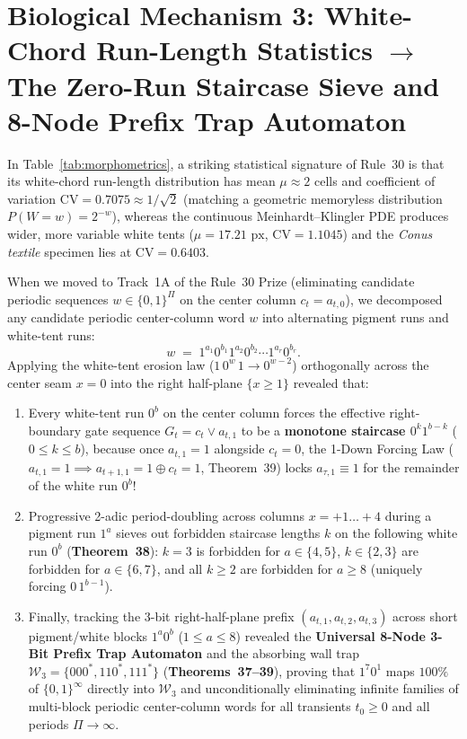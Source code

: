 \documentclass[11pt,a4paper]{article}
\theoremstyle{definition}
\theoremstyle{remark}
\begin{document}
\section{Biological Mechanism 3: White-Chord Run-Length Statistics $\longrightarrow$ The Zero-Run Staircase Sieve and 8-Node Prefix Trap Automaton}

In Table~\ref{tab:morphometrics}, a striking statistical signature of Rule~30 is that its white-chord run-length distribution has mean $\mu \approx 2$ cells and coefficient of variation $\mathrm{CV} = 0.7075 \approx 1/\sqrt{2}$ (matching a geometric memoryless distribution $P(W = w) = 2^{-w}$), whereas the continuous Meinhardt--Klingler PDE produces wider, more variable white tents ($\mu = 17.21\text{ px}$, $\mathrm{CV} = 1.1045$) and the \emph{Conus textile} specimen lies at $\mathrm{CV} = 0.6403$.

When we moved to Track~1A of the Rule~30 Prize (eliminating candidate periodic sequences $w \in \{0,1\}^\Pi$ on the center column $c_t = a_{t,0}$), we decomposed any candidate periodic center-column word $w$ into alternating pigment runs and white-tent runs:
\begin{equation}
  w \;=\; 1^{a_1} 0^{b_1} 1^{a_2} 0^{b_2} \cdots 1^{a_r} 0^{b_r}.
\end{equation}
Applying the white-tent erosion law ($1\,0^w\,1 \to 0^{w-2}$) orthogonally across the center seam $x = 0$ into the right half-plane $\{x \ge 1\}$ revealed that:
\begin{enumerate}
  \item Every white-tent run $0^b$ on the center column forces the effective right-boundary gate sequence $G_t = c_t \lor a_{t,1}$ to be a \textbf{monotone staircase $0^k 1^{b-k}$} ($0 \le k \le b$), because once $a_{t,1} = 1$ alongside $c_t = 0$, the 1-Down Forcing Law ($a_{t,1} = 1 \implies a_{t+1,1} = 1 \oplus c_t = 1$, Theorem~39) locks $a_{\tau,1} \equiv 1$ for the remainder of the white run $0^b$!
  \item Progressive 2-adic period-doubling across columns $x = +1 \dots +4$ during a pigment run $1^a$ sieves out forbidden staircase lengths $k$ on the following white run $0^b$ (\textbf{Theorem~38}): $k = 3$ is forbidden for $a \in \{4,5\}$, $k \in \{2,3\}$ are forbidden for $a \in \{6,7\}$, and all $k \ge 2$ are forbidden for $a \ge 8$ (uniquely forcing $0\,1^{b-1}$).
  \item Finally, tracking the 3-bit right-half-plane prefix $(a_{t,1}, a_{t,2}, a_{t,3})$ across short pigment/white blocks $1^a 0^b$ ($1 \le a \le 8$) revealed the \textbf{Universal 8-Node 3-Bit Prefix Trap Automaton} and the absorbing wall trap $\mathcal{W}_3 = \{000^*, 110^*, 111^*\}$ (\textbf{Theorems~37--39}), proving that $1^7 0^1$ maps $100\%$ of $\{0,1\}^\infty$ directly into $\mathcal{W}_3$ and unconditionally eliminating infinite families of multi-block periodic center-column words for all transients $t_0 \ge 0$ and all periods $\Pi \to \infty$.
\end{enumerate}
\end{document}
